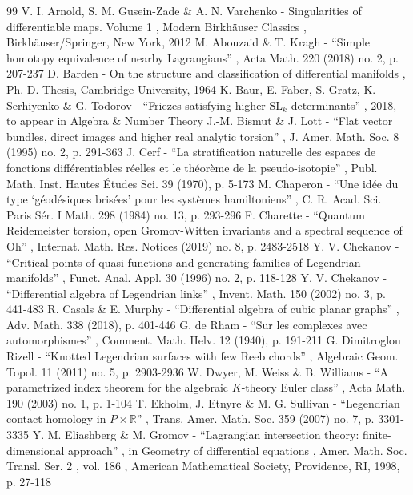 \documentclass[11pt]{article}
\numberwithin{equation}{section}\providecommand{\dpl}{\displaystyle}
\theoremstyle{plain}
\theoremstyle{definition}
\begin{document}
\begin{thebibliography}{99}
 V. I. Arnold, S. M. Gusein-Zade \& A. N. Varchenko - Singularities of differentiable maps. Volume 1 , Modern Birkhäuser Classics , Birkhäuser/Springer, New York, 2012
 M. Abouzaid \& T. Kragh - “Simple homotopy equivalence of nearby Lagrangians” , Acta Math. 220 (2018) no. 2, p. 207-237
 D. Barden - On the structure and classification of differential manifolds , Ph. D. Thesis, Cambridge University, 1964
 K. Baur, E. Faber, S. Gratz, K. Serhiyenko \& G. Todorov - “Friezes satisfying higher $\mathrm{SL}_k$-determinants” , 2018, to appear in Algebra \& Number Theory
 J.-M. Bismut \& J. Lott - “Flat vector bundles, direct images and higher real analytic torsion” , J. Amer. Math. Soc. 8 (1995) no. 2, p. 291-363
 J. Cerf - “La stratification naturelle des espaces de fonctions différentiables réelles et le théorème de la pseudo-isotopie” , Publ. Math. Inst. Hautes Études Sci. 39 (1970), p. 5-173
 M. Chaperon - “Une idée du type ‘géodésiques brisées’ pour les systèmes hamiltoniens” , C. R. Acad. Sci. Paris Sér. I Math. 298 (1984) no. 13, p. 293-296
 F. Charette - “Quantum Reidemeister torsion, open Gromov-Witten invariants and a spectral sequence of Oh” , Internat. Math. Res. Notices (2019) no. 8, p. 2483-2518
 Y. V. Chekanov - “Critical points of quasi-functions and generating families of Legendrian manifolds” , Funct. Anal. Appl. 30 (1996) no. 2, p. 118-128
 Y. V. Chekanov - “Differential algebra of Legendrian links” , Invent. Math. 150 (2002) no. 3, p. 441-483
 R. Casals \& E. Murphy - “Differential algebra of cubic planar graphs” , Adv. Math. 338 (2018), p. 401-446
 G. de Rham - “Sur les complexes avec automorphismes” , Comment. Math. Helv. 12 (1940), p. 191-211
 G. Dimitroglou Rizell - “Knotted Legendrian surfaces with few Reeb chords” , Algebraic Geom. Topol. 11 (2011) no. 5, p. 2903-2936
 W. Dwyer, M. Weiss \& B. Williams - “A parametrized index theorem for the algebraic $K$-theory Euler class” , Acta Math. 190 (2003) no. 1, p. 1-104
 T. Ekholm, J. Etnyre \& M. G. Sullivan - “Legendrian contact homology in $P\times \mathbb{R}$” , Trans. Amer. Math. Soc. 359 (2007) no. 7, p. 3301-3335
 Y. M. Eliashberg \& M. Gromov - “Lagrangian intersection theory: finite-dimensional approach” , in Geometry of differential equations , Amer. Math. Soc. Transl. Ser. 2 , vol. 186 , American Mathematical Society, Providence, RI, 1998, p. 27-118

\end{thebibliography}
\end{document}
